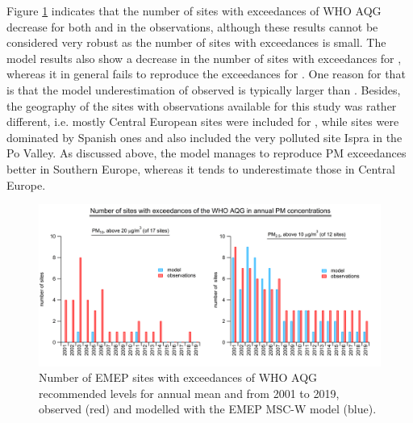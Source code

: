 Figure \ref{fig:pmExc_trends} indicates that the number of sites with exceedances of WHO AQG decrease for both \PM[10] and \PM[2.5] in the observations, although these results cannot be considered very robust as the number of sites with exceedances is small. The model results also show a decrease in the number of sites with exceedances for \PM[2.5], whereas it in general fails to reproduce the exceedances for \PM[10]. One reason for that is that the model underestimation of observed \PM[10] is typically larger than \PM[2.5]. Besides, the geography of the sites with observations available for this study was rather different, i.e. mostly Central European sites were included for \PM[10], while \PM[2.5] sites were dominated by Spanish ones and also included the very polluted site Ispra in the Po Valley. As discussed above, the model manages to reproduce PM exceedances better in Southern Europe, whereas it tends to underestimate those in Central Europe.  




\begin{figure}
	\centering
	\includegraphics[width=0.74\paperwidth]{FIGS_TRENDS/exceedences.png}
	\caption{\label{fig:pmExc_trends} Number of EMEP sites with exceedances of WHO AQG recommended levels for annual mean  \PM[10]  and \PM[2.5] from 2001 to 2019, observed (red) and modelled with the EMEP MSC-W model (blue).}
\end{figure}



